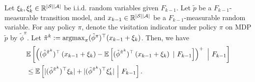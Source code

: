 \begin{lemma} \label{lemma:xi_xi'}
	Let $\xi_k,\xi'_k \in \mathbb{R}^{|\mathcal{S}||\mathcal{A}|}$ be i.i.d. random variables given $F_{k-1}$. Let $\tilde{p}$ be a $F_{k-1}$-measurable transition model, and $x_{k-1} \in \mathbb{R}^{|\mathcal{S}||\mathcal{A}|}$ be  a $F_{k-1}$-measurable random variable. For any policy $\pi$, denote the visitation indicator under policy $\pi$ on MDP $\tilde{p}$ by $\tilde{\phi}^{\pi}$. Let $\tilde{\pi}^k:= \argmax_{\pi} (\tilde{\phi}^{\pi})^\top (x_{k-1} + \xi_k)$. Then, we have
	\begin{align*}
		& \mathbb{E}\left[  \left(  (\tilde{\phi}^{\tilde{\pi}^k})^\top \left(  x_{k-1} + \xi_k  \right) - \mathbb{E}\left[  (\tilde{\phi}^{\tilde{\pi}^k})^\top \left(  x_{k-1} + \xi_k  \right) \ |\ F_{k-1}   \right]  \right)^{+} \ \Big|\ F_{k-1}  \right]
		\\
		&\leq \mathbb{E}\left[  | (\tilde{\phi}^{\tilde{\pi}^k})^\top \xi_k | + | (\tilde{\phi}^{\tilde{\pi}^k})^\top \xi'_k| \ \Big|\ F_{k-1}  \right] .
	\end{align*}
\end{lemma}
